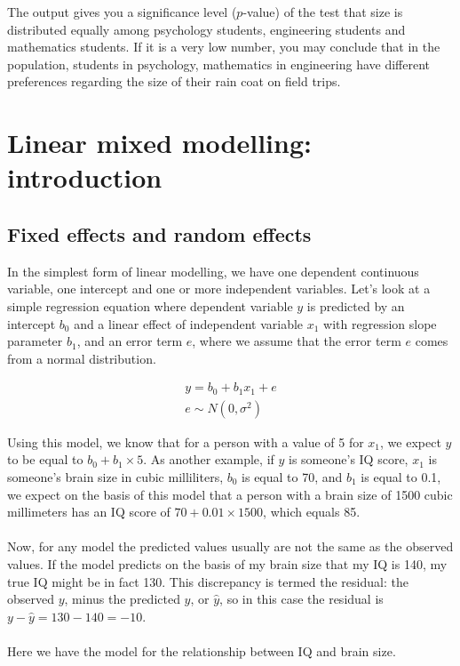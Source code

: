 \documentclass[]{report}\usepackage[]{graphicx}\usepackage[]{color}
\begin{document}
The output gives you a significance level ($p$-value) of the test that size is distributed equally among psychology students, engineering students and mathematics students. If it is a very low number, you may conclude that in the population, students in psychology, mathematics in engineering have different preferences regarding the size of their rain coat on field trips. 




\chapter{Linear mixed modelling: introduction}


\section{Fixed effects and random effects}
In the simplest form of linear modelling, we have one dependent continuous variable, one intercept and one or more independent variables. Let's look at a simple regression equation where dependent variable $y$ is predicted by an intercept $b_0$ and a linear effect of independent variable $x_1$ with regression slope parameter $b_1$, and an error term $e$, where we assume that the error term $e$ comes from a normal distribution. 


\begin{eqnarray}
y = b_0 + b_1 x_1 + e \\
e \sim N(0, \sigma^2)
\end{eqnarray}

Using this model, we know that for a person with a value of 5 for $x_1$, we expect $y$ to be equal to $b_0 + b_1 \times 5$. As another example, if $y$ is someone's IQ score, $x_1$ is someone's brain size in cubic milliliters, $b_0$ is equal to 70, and $b_1$ is equal to 0.1, we expect on the basis of this model that a person with a brain size of 1500 cubic millimeters has an IQ score of $70 + 0.01 \times 1500$, which equals 85.
\\
\\
Now, for any model the predicted values usually are not the same as the observed values. If the model predicts on the basis of my brain size that my IQ is 140, my true IQ might be in fact 130. This discrepancy is termed the residual: the observed $y$, minus the predicted $y$, or $\hat{y}$, so in this case the residual is $y - \hat{y}=130-140= -10$.
\\
\\
Here we have the model for the relationship between IQ and brain size.
\end{document}
